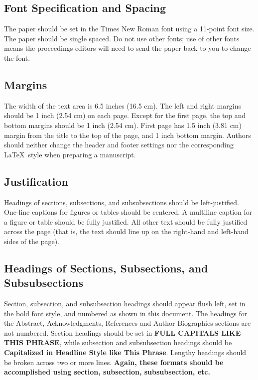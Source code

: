 \documentclass{wscpaperproc}
\theoremstyle{wsc}
\begin{document}
\subsection{Font Specification and Spacing}
The paper should be set in the Times New Roman font using a 11-point font size. The paper should be single spaced. Do not use other fonts; use of other fonts means the proceedings editors will need to send the paper back to you to change the font.

\subsection{Margins}
\label{sec:margins}
The width of the text area is 6.5 inches (16.5 cm). The left and right margins should be 1 inch (2.54 cm) on each page. Except for the first page, the top and bottom margins should be 1 inch (2.54 cm). First page has 1.5 inch (3.81 cm) margin from the title to the top of the page, and 1 inch bottom margin. Authors should neither change the header and footer settings nor the corresponding \LaTeX\ style when preparing a manuscript.

\subsection{Justification}
Headings of sections, subsections, and subsubsections should be left-justified. One-line captions for figures or tables should be centered. A multiline caption for a figure or table should be fully justified. All other text should be fully justified across the page (that is, the text should line up on the right-hand and left-hand sides of the page).

\subsection{Headings of Sections, Subsections, and Subsubsections}
Section, subsection, and subsubsection headings should appear flush left, set in the bold font style, and numbered as shown in this document. The headings for the Abstract, Acknowledgments, References and Author Biographies sections are not numbered. Section headings should be set in \textbf{FULL CAPITALS LIKE THIS PHRASE}, while subsection and subsubsection headings should be \textbf{Capitalized in Headline Style like This Phrase}. Lengthy headings should be broken across two or more lines. \textbf{Again, these formats should be accomplished using section, subsection, subsubsection, etc.}
\end{document}
